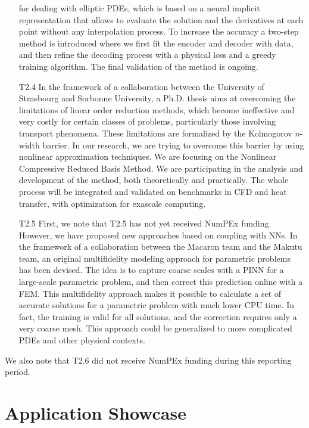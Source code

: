 \begin{itemize}
  for dealing with elliptic PDEs, which  is based on a neural implicit
  representation  that  allows  to   evaluate  the  solution  and  the
  derivatives  at each  point without  any interpolation  process.  To
  increase the accuracy a two-step method is introduced where we first fit the encoder and decoder with data, and then refine the decoding process with a physical loss and a greedy training algorithm. The final validation of the method is ongoing.
\item[T2.4] In the framework of a collaboration between the University
  of  Strasbourg  and
  Sorbonne University, a Ph.D. thesis aims  at  overcoming  the  limitations  of  linear  order  reduction
  methods,  which  become  ineffective  and very  costly  for  certain
  classes   of  problems,   particularly  those   involving  transport
  phenomena.   These  limitations  are formalized  by  the  Kolmogorov
  $n$-width barrier.  In our research,  we are trying to overcome this
  barrier  by  using  nonlinear   approximation  techniques.   We  are
  focusing on the Nonlinear Compressive  Reduced Basis Method.  We are
  participating in  the analysis and  development of the  method, both
  theoretically and practically. The  whole process will be integrated
  and  validated  on  benchmarks  in   CFD  and  heat  transfer,  with
  optimization for exascale computing.
\item[T2.5] First, we note that T2.5 has not yet received NumPEx funding. However,  we have proposed new approaches  based on coupling
  with NNs.  In  the framework of a collaboration  between the Macaron
  team and the Makutu  team,  an original multifidelity  modeling approach  for parametric  problems has  been
  devised.  The  idea is to  capture coarse scales  with a PINN  for a
  large-scale  parametric problem,  and then  correct this  prediction
  online with a FEM.  This multifidelity approach makes it possible to
  calculate a set of accurate  solutions for a parametric problem with
  much  lower CPU  time.   In  fact, the  training  is  valid for  all
  solutions, and the correction requires only a very coarse mesh. This
  approach could  be generalized  to more  complicated PDEs  and other
  physical contexts.
\end{itemize}

We also note that T2.6 did not receive NumPEx funding during this reporting period.

\section{Application Showcase}
% 
%  

